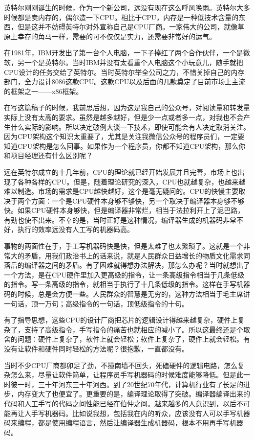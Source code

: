 \documentclass[
  letterpaper,
  DIV=11,
  numbers=noendperiod]{scrreprt}
\begin{document}
英特尔刚刚诞生的时候，作为一个新公司，远没有现在这么呼风唤雨。英特尔大多时候都是卖内存的，偶尔造一下CPU。相比于CPU，内存是一种低技术含量的东西，但是这并不妨碍英特尔对外宣称自己是CPU厂商。一家伟大的公司，就像草原上幸存的角马一样，需要的可不仅仅是实力，还需要非常好的运气。

在1981年，IBM开发出了第一台个人电脑，一下子捧红了两个合作伙伴，一个是微软，另一个是英特尔。当时IBM并没有太看重个人电脑这个小玩意儿，随手就把CPU设计的任务交给了英特尔。当时英特尔举全公司之力，不惜关掉自己的内存部门，全力设计8086这款CPU。这款CPU以及后面的几款奠定了目前市场上主流的框架之一------x86框架。

在写这篇稿子的时候，我前思后想，因为这是我自己的公众号，对阅读量和转发量实际上没有太高的要求。虽然是越多越好，但是少一点或者多一点，对我也不会产生什么实际的影响。所以决定破例大谈一下技术，即使可能会有人决定取消关注。因为CPU架构这个知识太重要了，尤其是关注我微信公众号的程序员们，一定要知道CPU架构是怎么回事。如果作为一个程序员，你都不知道CPU架构，那么你和项目经理还有什么区别呢？

远在英特尔成立的十几年前，CPU的理论就已经开始发展并且完善，市场上也出现了各种各样的CPU。但是，随着理论研究的深入，CPU也就越复杂，也越来越难以制造。市场的需求是CPU越快越好，这个是毫无疑问的。CPU的快慢主要取决于两个方面：一个是CPU硬件本身够不够快，另一个取决于编译器本身够不够快。如果CPU硬件本身够快，但是编译器非常烂，相当于法拉利开上了泥巴路，有劲也使不出来。不幸的是，当时正好是这种情况，编译器生成的机器码非常不好，执行的效率远没有人工写的机器码高。

事物的两面性在于，手工写机器码快是快，但是太难了也太繁琐了。这就是一个非常大的矛盾，用我们政治书上的话来说，就是人民群众日益增长的物质文化需求同落后的编译器之间的矛盾。有了困难就得想办法解决，那怎么办呢？当时就想出了一个方法，是在CPU硬件里加入更高级的指令，让一条高级指令相当于几条低级的指令。写一条高级的指令，就相当于执行了十几条低级的指令。这样在手写机器码的时候，总是会方便一些。人民群众的智慧是无穷的，这种方法相当于毛主席讲一句话，顶一万句；高级指令的一句话，顶低级指令的十句。

有了指导思想，这些CPU的设计厂商把芯片的逻辑设计得越来越复杂，硬件上复杂了，支持了高级指令，手写指令的痛苦也就相应的减小了。所以这最终还是个取舍的问题：硬件上复杂了，软件上就会轻松；软件上复杂了，硬件上就会轻松。有没有让软件和硬件同时轻松的方法呢？很抱歉，一直都没有。

当时不少CPU厂商都卯足了劲，不撞南墙不回头，死磕硬件的逻辑电路，怎么复杂怎么来，尽量让软件简单，让程序员手写机器码的时候难度能够降低。但是此一时彼一时，三十年河东三十年河西。到了20世纪70年代，计算机行业有了长足的进步，内存变大了也便宜了。更重要的是，编译理论取得了突破。编译器编译出来的代码和人工手写的代码之间性能已经在伯仲之间。越来越多的人意识到，以后不可能再让人手写机器码。比如说我想，包括我在内的听众，应该没有人可以手写机器码来编程，都是使用编程语言，然后让编译器生成机器码，根本不用再手写机器码。
\end{document}

